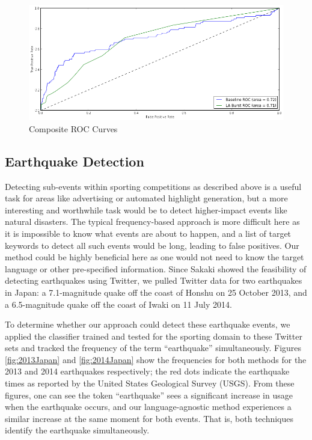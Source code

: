 \documentclass{acm_proc_article-sp}
\begin{document}
\begin{figure}[hbtp]
\begin{center}
\includegraphics[width=5in]{./figures/roc_Comp.png}
\caption{Composite ROC Curves}
\label{fig:rocComprehensive}
\end{center}
\end{figure}

\subsection{Earthquake Detection}

Detecting sub-events within sporting competitions as described above is a useful task for areas like advertising or automated highlight generation, but a more interesting and worthwhile task would be to detect higher-impact events like natural disasters.
The typical frequency-based approach is more difficult here as it is impossible to know what events are about to happen, and a list of target keywords to detect all such events would be long, leading to false positives.
Our method could be highly beneficial here as one would not need to know the target language or other pre-specified information.
Since Sakaki showed the feasibility of detecting earthquakes using Twitter, we pulled Twitter data for two earthquakes in Japan: a 7.1-magnitude quake off the coast of Honshu on 25 October 2013, and a 6.5-magnitude quake off the coast of Iwaki on 11 July 2014.

To determine whether our approach could detect these earthquake events, we applied the classifier trained and tested for the sporting domain to these Twitter sets and tracked the frequency of the term ``earthquake'' simultaneously.
Figures \ref{fig:2013Japan} and \ref{fig:2014Japan} show the frequencies for both methods for the 2013 and 2014 earthquakes respectively; the red dots indicate the earthquake times as reported by the United States Geological Survey (USGS).
From these figures, one can see the token ``earthquake'' sees a significant increase in usage when the earthquake occurs, and our language-agnostic method experiences a similar increase at the same moment for both events.
That is, both techniques identify the earthquake simultaneously.
\end{document}
